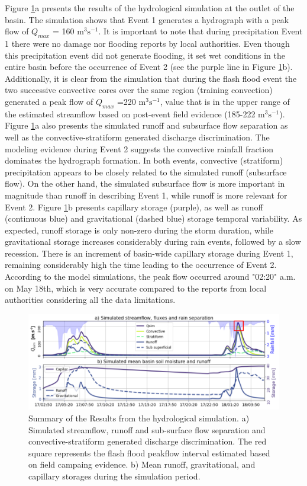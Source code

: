\documentclass[hess, manuscript]{copernicus}
\begin{document}
Figure \ref{fig:SimStreamflow}a presents the results of the hydrological simulation at the outlet of the basin.   The simulation shows that Event 1 generates a hydrograph with a peak flow of $Q_{max}$ = 160 m$^3 \text{s}^{-1}$. It is important to note that during precipitation Event 1 there were no damage nor flooding reports by local authorities. Even though this precipitation event did not generate  flooding, it set wet conditions in the entire basin before the occurrence of Event 2  (see the purple line in Figure \ref{fig:SimStreamflow}b). Additionally,  it is clear from the simulation that during the flash flood event the two successive convective cores over the same region (training convection) generated a peak flow of $Q_{max}$ =220 m$^3 \text{s}^{-1}$, value that is in the upper range of the estimated streamflow based on post-event field evidence (185-222 m$^3 \text{s}^{-1}$). Figure \ref{fig:SimStreamflow}a also presents the simulated runoff and subsurface flow separation as well as the convective-stratiform generated discharge discrimination.  The modeling evidence during Event 2 suggests the convective rainfall fraction dominates the hydrograph formation. In both events, convective (stratiform) precipitation appears to be closely related to the simulated runoff (subsurface flow).  On the other hand, the simulated subsurface flow is more important in magnitude than runoff in describing Event 1, while runoff is more relevant for Event 2. Figure \ref{fig:SimStreamflow}b presents capillary storage (purple), as well as runoff (continuous blue) and gravitational (dashed blue) storage temporal variability.  As expected, runoff storage is only non-zero during the storm duration, while gravitational storage increases considerably during rain events, followed by a slow recession.  There is an increment of basin-wide capillary storage during Event 1, remaining considerably high the time leading to the occurrence of Event 2. According to the model simulations, the peak flow occurred around "02:20" a.m. on May 18th, which is very accurate compared to the reports from local authorities considering all the data limitations.\\

\begin{figure}[t]
\centering
 \includegraphics[width=12cm]{Figures/Caudal_Sim_v2.png}
 \caption{Summary of the Results from the hydrological simulation. a) Simulated streamflow,  runoff and sub-surface flow separation and convective-stratiform generated discharge discrimination. The red square represents the flash flood peakflow interval estimated based on  field campaing evidence. b) Mean runoff, gravitational, and capillary storages during the simulation period.}
    \label{fig:SimStreamflow}
\end{figure}
\end{document}
